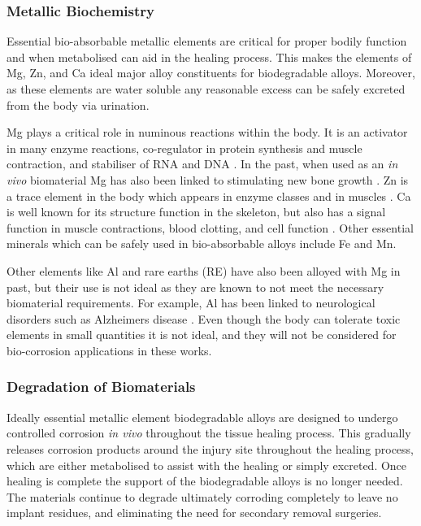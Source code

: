 \documentclass[draft,a4paper,12pt,oneside]{report}%
\begin{document}
\subsubsection{Metallic Biochemistry}
Essential bio-absorbable metallic elements are critical for proper bodily function and when metabolised can aid in the healing process. This makes the elements of Mg, Zn, and Ca ideal major alloy constituents for biodegradable alloys. Moreover, as these elements are water soluble any reasonable excess can be safely excreted from the body via urination.

Mg plays a critical role in numinous reactions within the body. It is an activator in many enzyme reactions, co-regulator in protein synthesis and muscle contraction, and stabiliser of RNA and DNA \cite{Zheng2014} . In the past, when used as an \textit{in vivo} biomaterial Mg has also been linked to stimulating new bone growth  \cite{Witte2010}. Zn is a trace element in the body which appears in enzyme classes and in muscles \cite{Zheng2014}. Ca is well known for its structure function in the skeleton, but also has a signal function in muscle contractions, blood clotting, and cell function \cite{Zheng2014}. Other essential minerals which can be safely used in bio-absorbable alloys include Fe and Mn.

Other elements like Al and rare earths (RE) have also been alloyed with Mg in past, but their use is not ideal as they are known to not meet the necessary biomaterial requirements. For example, Al has been linked to neurological disorders such as Alzheimers disease \cite{Zheng2014}. Even though the body can tolerate toxic elements in small quantities it is not ideal, and they will not be considered for bio-corrosion applications in these works. 

\subsubsection{Degradation of Biomaterials} 
Ideally essential metallic element biodegradable alloys are designed to undergo controlled corrosion \textit{in vivo} throughout the tissue healing process. This gradually releases corrosion products around the injury site throughout the healing process, which are either metabolised to assist with the healing or simply excreted. Once healing is complete the support of the biodegradable alloys is no longer needed. The materials continue to degrade ultimately corroding completely to leave no implant residues, and eliminating the need for secondary removal surgeries.  
\end{document}
